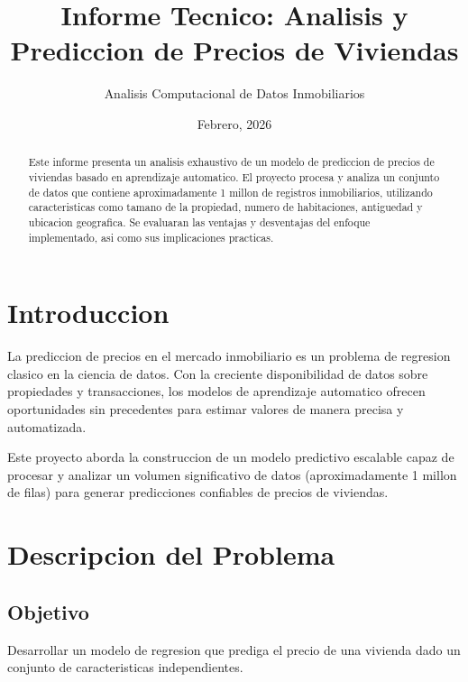 \documentclass[12pt,a4paper]{article}
\title{\textbf{Informe Tecnico: Analisis y Prediccion de Precios de Viviendas}}
\author{Analisis Computacional de Datos Inmobiliarios}
\date{Febrero, 2026}
\begin{document}
\maketitle

\begin{abstract}
Este informe presenta un analisis exhaustivo de un modelo de prediccion de precios de viviendas basado en aprendizaje automatico. El proyecto procesa y analiza un conjunto de datos que contiene aproximadamente 1 millon de registros inmobiliarios, utilizando caracteristicas como tamano de la propiedad, numero de habitaciones, antiguedad y ubicacion geografica. Se evaluaran las ventajas y desventajas del enfoque implementado, asi como sus implicaciones practicas.
\end{abstract}

\tableofcontents
\newpage

\section{Introduccion}

La prediccion de precios en el mercado inmobiliario es un problema de regresion clasico en la ciencia de datos. Con la creciente disponibilidad de datos sobre propiedades y transacciones, los modelos de aprendizaje automatico ofrecen oportunidades sin precedentes para estimar valores de manera precisa y automatizada.

Este proyecto aborda la construccion de un modelo predictivo escalable capaz de procesar y analizar un volumen significativo de datos (aproximadamente 1 millon de filas) para generar predicciones confiables de precios de viviendas.

\section{Descripcion del Problema}

\subsection{Objetivo}
Desarrollar un modelo de regresion que prediga el precio de una vivienda dado un conjunto de caracteristicas independientes.
\end{document}
